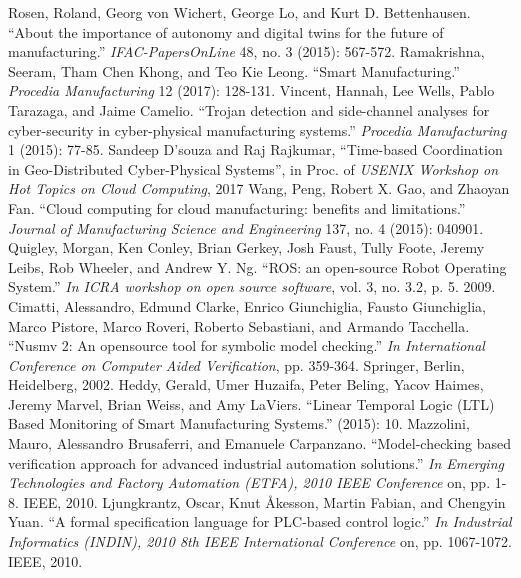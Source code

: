 \documentclass[3p,twocolumn,times,procedia]{elsarticle}
\newcommand{\quotes}[1]{``#1''}
\begin{document}
\vspace*{-3pt}
\begin{thebibliography}{}


\vspace*{-3pt}
Rosen, Roland, Georg von Wichert, George Lo, and Kurt D. Bettenhausen. \quotes{About the importance of autonomy and digital twins for the future of manufacturing.} \emph{IFAC-PapersOnLine} 48, no. 3 (2015): 567-572.
Ramakrishna, Seeram, Tham Chen Khong, and Teo Kie Leong. \quotes{Smart Manufacturing.} \emph{Procedia Manufacturing} 12 (2017): 128-131.
Vincent, Hannah, Lee Wells, Pablo Tarazaga, and Jaime Camelio. \quotes{Trojan detection and side-channel analyses for cyber-security in cyber-physical manufacturing systems.} \emph{Procedia Manufacturing} 1 (2015): 77-85.
Sandeep D'souza and Raj Rajkumar, \quotes{Time-based Coordination in Geo-Distributed Cyber-Physical Systems}, in Proc. of \emph{USENIX Workshop on Hot Topics on Cloud Computing}, 2017
Wang, Peng, Robert X. Gao, and Zhaoyan Fan. \quotes{Cloud computing for cloud manufacturing: benefits and limitations.} \emph{Journal of Manufacturing Science and Engineering} 137, no. 4 (2015): 040901.
Quigley, Morgan, Ken Conley, Brian Gerkey, Josh Faust, Tully Foote, Jeremy Leibs, Rob Wheeler, and Andrew Y. Ng. \quotes{ROS: an open-source Robot Operating System.} \emph{In ICRA workshop on open source software}, vol. 3, no. 3.2, p. 5. 2009.
Cimatti, Alessandro, Edmund Clarke, Enrico Giunchiglia, Fausto Giunchiglia, Marco Pistore, Marco Roveri, Roberto Sebastiani, and Armando Tacchella. \quotes{Nusmv 2: An opensource tool for symbolic model checking.} \emph{In International Conference on Computer Aided Verification}, pp. 359-364. Springer, Berlin, Heidelberg, 2002.
Heddy, Gerald, Umer Huzaifa, Peter Beling, Yacov Haimes, Jeremy Marvel, Brian Weiss, and Amy LaViers. \quotes{Linear Temporal Logic (LTL) Based Monitoring of Smart Manufacturing Systems.} (2015): 10.
Mazzolini, Mauro, Alessandro Brusaferri, and Emanuele Carpanzano. \quotes{Model-checking based verification approach for advanced industrial automation solutions.} \emph{In Emerging Technologies and Factory Automation (ETFA), 2010 IEEE Conference} on, pp. 1-8. IEEE, 2010.
Ljungkrantz, Oscar, Knut Åkesson, Martin Fabian, and Chengyin Yuan. \quotes{A formal specification language for PLC-based control logic.} \emph{In Industrial Informatics (INDIN), 2010 8th IEEE International Conference} on, pp. 1067-1072. IEEE, 2010.

\end{thebibliography}
\end{document}
